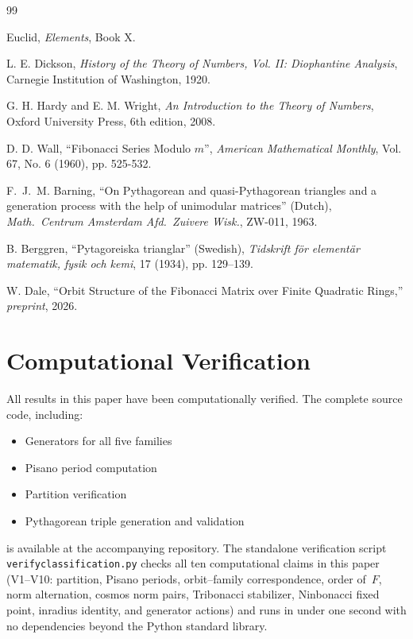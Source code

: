 \documentclass[12pt]{article}
\begin{document}
\begin{thebibliography}{99}

Euclid, \emph{Elements}, Book X.

L. E. Dickson, \emph{History of the Theory of Numbers, Vol. II: Diophantine Analysis}, Carnegie Institution of Washington, 1920.

G. H. Hardy and E. M. Wright, \emph{An Introduction to the Theory of Numbers}, Oxford University Press, 6th edition, 2008.

D. D. Wall, ``Fibonacci Series Modulo $m$'', \emph{American Mathematical Monthly}, Vol. 67, No. 6 (1960), pp. 525-532.

F.~J.~M. Barning, ``On Pythagorean and quasi-Pythagorean triangles and a generation process with the help of unimodular matrices'' (Dutch), \emph{Math.\ Centrum Amsterdam Afd.\ Zuivere Wisk.}, ZW-011, 1963.

B. Berggren, ``Pytagoreiska trianglar'' (Swedish), \emph{Tidskrift f{\"o}r element{\"a}r matematik, fysik och kemi}, 17 (1934), pp. 129--139.

W. Dale, ``Orbit Structure of the Fibonacci Matrix over Finite Quadratic Rings,''
\emph{preprint}, 2026.

\end{thebibliography}

\appendix

\section{Computational Verification}

{\sloppy
All results in this paper have been computationally verified. The complete source code, including:
\begin{itemize}
\item Generators for all five families
\item Pisano period computation
\item Partition verification
\item Pythagorean triple generation and validation
\end{itemize}

is available at the accompanying repository.  The standalone verification script
\texttt{verify\discretionary{}{}{\_}classification.py} checks all ten computational claims in this paper
(V1--V10: partition, Pisano periods, orbit--family correspondence, order of~$F$,
norm alternation, cosmos norm pairs, Tribonacci stabilizer, Ninbonacci fixed point,
inradius identity, and generator actions) and runs in under one second with no
dependencies beyond the Python standard library.
} %
\end{document}
